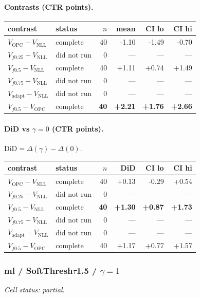 \documentclass[10pt,a4paper]{article}
\begin{document}
\paragraph{Contrasts (CTR points).}
{\centering\small\begin{tabular}{llrrrr}
\toprule contrast & status & $n$ & mean & CI lo & CI hi \\
\midrule
$V_{\mathrm{OPC}}-V_{\mathrm{NLL}}$ & complete & 40 & -1.10 & -1.49 & -0.70 \\
$V_{f0.25}-V_{\mathrm{NLL}}$ & did not run & 0 & --- & --- & --- \\
$V_{f0.5}-V_{\mathrm{NLL}}$ & complete & 40 & +1.11 & +0.74 & +1.49 \\
$V_{f0.75}-V_{\mathrm{NLL}}$ & did not run & 0 & --- & --- & --- \\
$V_{\mathrm{adapt}}-V_{\mathrm{NLL}}$ & did not run & 0 & --- & --- & --- \\
\textbf{$V_{f0.5}-V_{\mathrm{OPC}}$} & complete & \textbf{40} & \textbf{+2.21} & \textbf{+1.76} & \textbf{+2.66} \\
\bottomrule\end{tabular}\par}
\paragraph{DiD vs $\gamma=0$ (CTR points).} $\mathrm{DiD}=\Delta(\gamma)-\Delta(0)$.
{\centering\small\begin{tabular}{llrrrr}
\toprule contrast & status & $n$ & DiD & CI lo & CI hi \\
\midrule
$V_{\mathrm{OPC}}-V_{\mathrm{NLL}}$ & complete & 40 & +0.13 & -0.29 & +0.54 \\
$V_{f0.25}-V_{\mathrm{NLL}}$ & did not run & 0 & --- & --- & --- \\
\textbf{$V_{f0.5}-V_{\mathrm{NLL}}$} & complete & \textbf{40} & \textbf{+1.30} & \textbf{+0.87} & \textbf{+1.73} \\
$V_{f0.75}-V_{\mathrm{NLL}}$ & did not run & 0 & --- & --- & --- \\
$V_{\mathrm{adapt}}-V_{\mathrm{NLL}}$ & did not run & 0 & --- & --- & --- \\
$V_{f0.5}-V_{\mathrm{OPC}}$ & complete & 40 & +1.17 & +0.77 & +1.57 \\
\bottomrule\end{tabular}\par}
\bigskip
\subsubsection{ml / SoftThresh$\tau$1.5 / $\gamma=1$}
\emph{Cell status: partial}.
\end{document}
